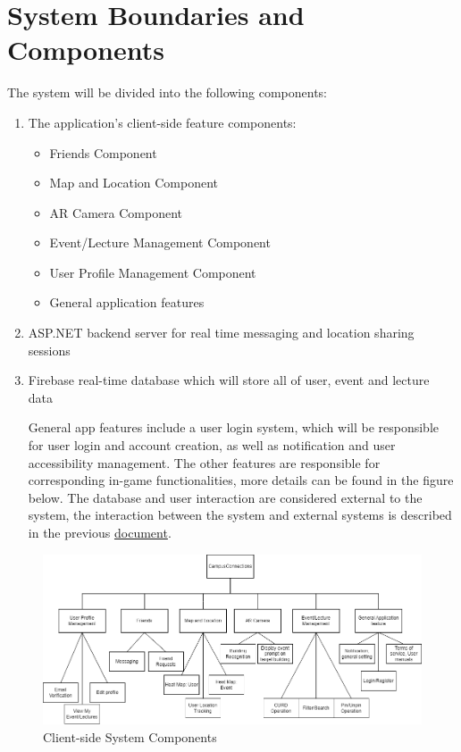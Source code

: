 \documentclass{article}
\begin{document}
\section{System Boundaries and Components}
The system will be divided into the following components:
\begin{enumerate}
	\item The application's client-side feature components:
	      \begin{itemize}
		      \item Friends Component
		      \item Map and Location Component
		      \item AR Camera Component
		      \item Event/Lecture Management Component
		      \item User Profile Management Component
		      \item General application features
	      \end{itemize}
	\item ASP.NET backend server for real time messaging and location sharing sessions
	\item Firebase real-time database which will store all of user, event and lecture data
	
\quad General app features include a user login system, which will be responsible for user login and account creation, as well as notification and user accessibility management. The other features are responsible for corresponding in-game functionalities, more details can be found in the figure below. The database and user interaction are considered external to the system, the interaction between the system and external systems is described in the previous \href{https://github.com/beatlepie/4G06CapstoneProjectTeam2/blob/docs-hazard-analysis/docs/SRS/SRS.pdf}{document}.
\end{enumerate}
\begin{figure}[H]
\begin{center}
\includegraphics[scale=0.4]{components.png}
\end{center}
\caption{Client-side System Components}
\end{figure}
\end{document}
